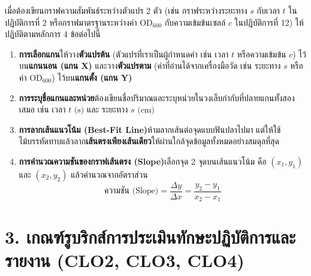 เมื่อต้องเขียนกราฟความสัมพันธ์ระหว่างตัวแปร 2 ตัว (เช่น กราฟระหว่างระยะทาง $s$ กับเวลา $t$ ในปฏิบัติการที่ 2 หรือกราฟมาตรฐานระหว่างค่า $\text{OD}_{600}$ กับความเข้มข้นเซลล์ $c$ ในปฏิบัติการที่ 12) ให้ปฏิบัติตามหลักการ 4 ข้อต่อไปนี้
\begin{enumerate}
    \item \textbf{การเลือกแกน}\quad ให้วาง\textbf{ตัวแปรต้น} (ตัวแปรที่เราเป็นผู้กำหนดค่า เช่น เวลา $t$ หรือความเข้มข้น $c$) ไว้บน\textbf{แกนนอน (แกน X)} และวาง\textbf{ตัวแปรตาม} (ค่าที่อ่านได้จากเครื่องมือวัด เช่น ระยะทาง $s$ หรือค่า $\text{OD}_{600}$) ไว้บน\textbf{แกนตั้ง (แกน Y)}
    \item \textbf{การระบุชื่อแกนและหน่วย}\quad ต้องเขียนชื่อปริมาณและระบุหน่วยในวงเล็บกำกับที่ปลายแกนทั้งสองเสมอ เช่น $\text{เวลา } t\text{ (s)}$ และ $\text{ระยะทาง } s\text{ (cm)}$
    \item \textbf{การลากเส้นแนวโน้ม (Best-Fit Line)}\quad ห้ามลากเส้นต่อจุดแบบฟันปลาไปมา แต่ให้ใช้ไม้บรรทัดทาบแล้วลาก\textbf{เส้นตรงเพียงเส้นเดียว}ให้ผ่านใกล้จุดข้อมูลทั้งหมดอย่างสมดุลที่สุด
    \item \textbf{การคำนวณความชันของกราฟเส้นตรง (Slope)}\quad เลือกจุด 2 จุดบนเส้นแนวโน้ม คือ $(x_1, y_1)$ และ $(x_2, y_2)$ แล้วคำนวณจากอัตราส่วน
    \begin{equation*}
        \text{ความชัน (Slope)} = \frac{\Delta y}{\Delta x} = \frac{y_2 - y_1}{x_2 - x_1}
    \end{equation*}
\end{enumerate}

\section*{3. เกณฑ์รูบริกส์การประเมินทักษะปฏิบัติการและรายงาน (CLO2, CLO3, CLO4)}

